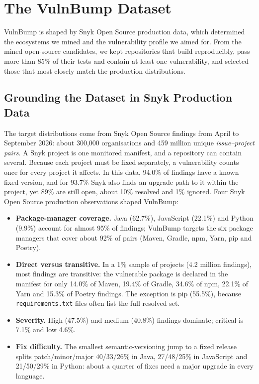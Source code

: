 \documentclass[11pt]{article}
\theoremstyle{definition}
\newcommand{\bench}{VulnBump}
\begin{document}
\section{The \bench{} Dataset}
\label{sec:dataset}

\bench{} is shaped by Snyk Open Source production data, which determined the ecosystems we mined and the vulnerability profile we aimed for. From the mined open-source candidates, we kept repositories that build reproducibly, pass more than 85\% of their tests and contain at least one vulnerability, and selected those that most closely match the production distributions.

\subsection{Grounding the Dataset in Snyk Production Data}
\label{sec:calibration}

The target distributions come from Snyk Open Source findings from April to September 2026: about 300{,}000 organisations and 459 million unique \emph{issue--project pairs}. A Snyk project is one monitored manifest, and a repository can contain several. Because each project must be fixed separately, a vulnerability counts once for every project it affects. In this data, 94.0\% of findings have a known fixed version, and for 93.7\% Snyk also finds an upgrade path to it within the project, yet 89\% are still open, about 10\% resolved and 1\% ignored. Four Snyk Open Source production observations shaped \bench{}:
\begin{itemize}
  \item \textbf{Package-manager coverage.} Java (62.7\%), JavaScript (22.1\%) and Python (9.9\%) account for almost 95\% of findings; \bench{} targets the six package managers that cover about 92\% of pairs (Maven, Gradle, npm, Yarn, pip and Poetry).
  \item \textbf{Direct versus transitive.} In a 1\% sample of projects (4.2 million findings), most findings are transitive: the vulnerable package is declared in the manifest for only 14.0\% of Maven, 19.4\% of Gradle, 34.6\% of npm, 22.1\% of Yarn and 15.3\% of Poetry findings. The exception is pip (55.5\%), because \texttt{requirements.txt} files often list the full resolved set.
  \item \textbf{Severity.} High (47.5\%) and medium (40.8\%) findings dominate; critical is 7.1\% and low 4.6\%.
  \item \textbf{Fix difficulty.} The smallest semantic-versioning jump to a fixed release splits patch/\allowbreak\mbox{minor}/\allowbreak major 40/33/26\% in Java, 27/48/25\% in JavaScript and 21/50/29\% in Python: about a quarter of fixes need a major upgrade in every language.
\end{itemize}
\end{document}
